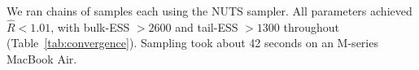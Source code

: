 We ran \nChains{} chains of \nSamples{} samples each using the NUTS sampler. All parameters achieved $\hat{R} < 1.01$, with bulk-ESS $> 2600$ and tail-ESS $> 1300$ throughout (Table~\ref{tab:convergence}). Sampling took about 42 seconds on an M-series MacBook Air.
